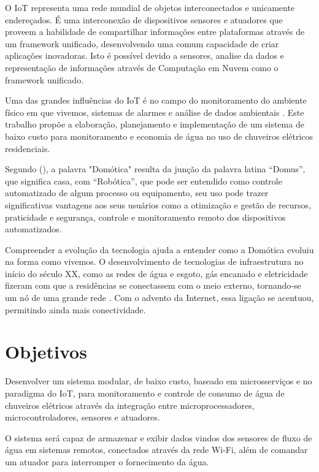 O IoT representa uma rede mundial de objetos interconectados e unicamente endereçados. É uma interconexão de dispositivos sensores e atuadores que proveem a habilidade de compartilhar informações entre plataformas através de um framework unificado, desenvolvendo uma comum capacidade de criar aplicações inovadoras. Isto é possível devido a sensores, analise da dados e representação de informações através de Computação em Nuvem como o framework unificado. \cite{RisteskaStojkoska2017}

Uma das grandes influências do IoT é no campo do monitoramento do ambiente físico em que vivemos, sistemas de alarmes e análise de dados ambientais \cite{Perumal2016}. Este trabalho propõe a elaboração, planejamento e implementação de um sistema de baixo custo para monitoramento e economia de água no uso de chuveiros elétricos residenciais.

Segundo \citeauthor{VarelaDeSouza} (\citeyear{VarelaDeSouza}), a palavra "Domótica" resulta da junção da palavra latina
“Domus”, que significa casa, com “Robótica”, que pode ser entendido como controle automatizado de algum processo ou equipamento, seu uso pode trazer significativas vantagens aos seus usuários como a otimização e gestão de recursos, praticidade e segurança, controle e monitoramento remoto dos dispositivos automatizados.

Compreender a evolução da tecnologia ajuda a entender como a
Domótica evoluiu na forma como vivemos. O desenvolvimento de tecnologias de infraestrutura no início do século XX, como as redes de água e esgoto, gás encanado e eletricidade fizeram com que a residências se conectassem com o meio externo, tornando-se um nó de uma grande rede \cite{forty2007objetos}. Com o advento da Internet, essa ligação se acentuou, permitindo ainda mais conectividade. \cite{VarelaDeSouza} 



\section{Objetivos}

Desenvolver um sistema modular, de baixo custo, baseado em microsserviços e no paradigma do IoT, para monitoramento e controle de consumo de água de chuveiros elétricos através da integração entre microprocessadores, microcontroladores, sensores e atuadores. 

O sistema será capaz de armazenar e exibir dados vindos dos sensores de fluxo de água em sistemas remotos, conectados através da rede Wi-Fi, além de comandar um atuador para interromper o fornecimento da água.

